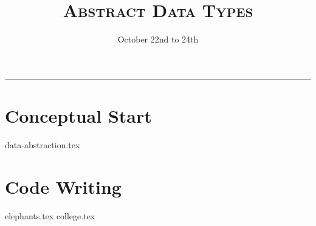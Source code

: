 \documentclass{exam}
\title{\textsc{Abstract Data Types}}
\date{October 22nd to 24th}
\begin{document}
\maketitle
\rule{\textwidth}{0.15em}
\fontsize{12}{15}\selectfont


\vspace{-1.5em}
\begin{questions}
\section{Conceptual Start}
{data-abstraction.tex}
\section{Code Writing}
{elephants.tex}
\newpage
{college.tex}



\end{questions}
\end{document}
